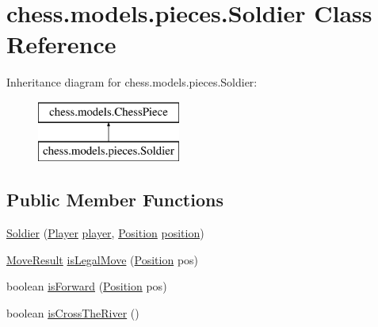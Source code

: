 \hypertarget{classchess_1_1models_1_1pieces_1_1_soldier}{}\section{chess.\+models.\+pieces.\+Soldier Class Reference}
\label{classchess_1_1models_1_1pieces_1_1_soldier}
Inheritance diagram for chess.\+models.\+pieces.\+Soldier\+:\begin{figure}[H]
\begin{center}
\leavevmode
\includegraphics[height=2.000000cm]{classchess_1_1models_1_1pieces_1_1_soldier}
\end{center}
\end{figure}
\subsection*{Public Member Functions}
\begin{DoxyCompactItemize}
\item 
\mbox{\hyperlink{classchess_1_1models_1_1pieces_1_1_soldier_a3de8743b5a054a97b126297e3e5fea36}{Soldier}} (\mbox{\hyperlink{enumchess_1_1models_1_1enums_1_1_player}{Player}} \mbox{\hyperlink{classchess_1_1models_1_1_chess_piece_a3bcc8a24667318b5aab8c146adcc3eb7}{player}}, \mbox{\hyperlink{classchess_1_1models_1_1_position}{Position}} \mbox{\hyperlink{classchess_1_1models_1_1_chess_piece_a0e4f8616b75e548f269d3971846396f3}{position}})
\item 
\mbox{\hyperlink{enumchess_1_1models_1_1enums_1_1_move_result}{Move\+Result}} \mbox{\hyperlink{classchess_1_1models_1_1pieces_1_1_soldier_a5a0cc5ebe1f0a4b2b68b9359f5bad0c5}{is\+Legal\+Move}} (\mbox{\hyperlink{classchess_1_1models_1_1_position}{Position}} pos)
\item 
boolean \mbox{\hyperlink{classchess_1_1models_1_1pieces_1_1_soldier_a3be305544d8e788663b6c394d334f596}{is\+Forward}} (\mbox{\hyperlink{classchess_1_1models_1_1_position}{Position}} pos)
\item 
boolean \mbox{\hyperlink{classchess_1_1models_1_1pieces_1_1_soldier_a9ee2ecb79068bd41f01608f23cd8dd01}{is\+Cross\+The\+River}} ()
\end{DoxyCompactItemize}


